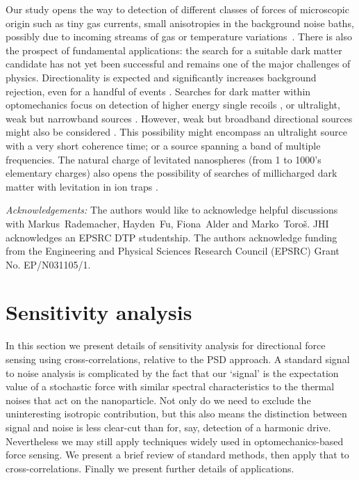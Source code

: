 \documentclass[twocolumn,english,notitlepage,superscriptaddress,nofootinbib]{revtex4-2}
\begin{document}
Our study opens the way to detection of different classes of forces of microscopic origin such as tiny gas currents,  small anisotropies in the background noise baths,  possibly due to incoming streams of gas or temperature variations~\cite{Millen2014}.  There is also the prospect of fundamental applications:  the search for a suitable dark matter candidate has not yet been successful and remains one of the major  challenges of physics.   Directionality is expected and significantly increases background rejection,  even for a handful of events \cite{ahlen2010case}.  Searches for dark matter within optomechanics focus on detection of higher energy single recoils \cite{Carney2021a},  or ultralight,  weak  but narrowband sources \cite{Carney2021b}.    However,  weak but broadband directional sources might also be considered \cite{centers2021stochastic}.   This possibility might encompass an ultralight source with a very short coherence time; or a source spanning a band of multiple frequencies.   The natural charge of levitated nanospheres (from 1 to 1000's elementary charges) also opens the possibility of searches of millicharged dark matter \cite{MilliCharges2023} with levitation in ion traps \cite{Millen2015,Bullier2020,Pontin2020}.


{\em Acknowledgements:} The authors would like to acknowledge helpful discussions with Markus~Rademacher, Hayden~Fu, Fiona~Alder  and Marko~Toro\v{s}.  JHI acknowledges an EPSRC DTP studentship. The authors acknowledge funding from the Engineering and Physical Sciences Research Council (EPSRC) Grant No. EP/N031105/1.




\appendix


\section{Sensitivity analysis}

In this  section we present details of  sensitivity analysis for directional force sensing using cross-correlations, relative to the PSD approach.
A standard signal to noise analysis is complicated by the fact that our `signal' is the expectation value of a stochastic force with similar spectral characteristics to the thermal noises that act on the nanoparticle.  Not only do we need to exclude the uninteresting isotropic contribution,  but this also means the distinction between signal and noise is less clear-cut than for, say, detection of a harmonic drive.  Nevertheless we may still apply  techniques widely used  in optomechanics-based force sensing. We present a brief review of standard methods, then apply that to cross-correlations.
Finally we present further details of applications.
\end{document}
